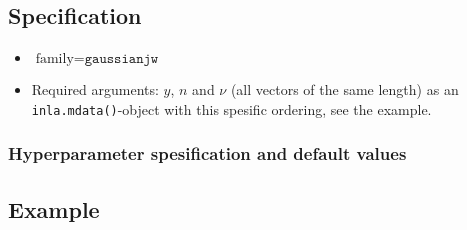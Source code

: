 \documentclass[a4paper,11pt]{article}
\begin{document}
\subsection*{Specification}

\begin{itemize}
\item $\text{family}=\texttt{gaussianjw}$
\item Required arguments: $y$, $n$ and $\nu$ (all vectors of the same
    length) as an \texttt{inla.mdata()}-object with this spesific
    ordering, see the example.
\end{itemize}



\subsubsection*{Hyperparameter spesification and default values}


\subsection*{Example}
\end{document}
